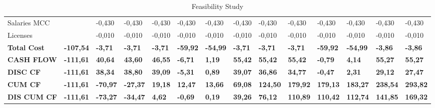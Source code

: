 \begin{landscape}
\begin{table}[]
{\begin{tabular}{| l | l | l | l | l | l | l | l | l | l | l | l | l | l |}
Salaries MCC                                                                           &                  & -0,430          & -0,430          & -0,430          & -0,430          & -0,430          & -0,430          & -0,430          & -0,430          & -0,430          & -0,430           & -0,430           & -0,430           \\
Licenses                                                                               &                  & -0,010          & -0,010          & -0,010          & -0,010          & -0,010          & -0,010          & -0,010          & -0,010          & -0,010          & -0,010           & -0,010           & -0,010           \\
\textbf{Total Cost}                                                                    & \textbf{-107,54} & \textbf{-3,71}  & \textbf{-3,71}  & \textbf{-3,71}  & \textbf{-59,92} & \textbf{-54,99} & \textbf{-3,71}  & \textbf{-3,71}  & \textbf{-3,71}  & \textbf{-59,92} & \textbf{-54,99}  & \textbf{-3,86}   & \textbf{-3,86}   
\\ \hline \hline
\rowcolor[gray]{0.85}
\textbf{CASH FLOW}                                                                     & \textbf{-111,61} & \textbf{40,64}  & \textbf{43,60}  & \textbf{46,55}  & \textbf{-6,71}  & \textbf{1,19}   & \textbf{55,42}  & \textbf{55,42}  & \textbf{55,42}  & \textbf{-0,79}  & \textbf{4,14}    & \textbf{55,27}   & \textbf{55,27}   \\
\rowcolor[gray]{0.85}
\textbf{DISC CF}                                                                       & \textbf{-111,61} & \textbf{38,34}  & \textbf{38,80}  & \textbf{39,09}  & \textbf{-5,31}  & \textbf{0,89}   & \textbf{39,07}  & \textbf{36,86}  & \textbf{34,77}  & \textbf{-0,47}  & \textbf{2,31}    & \textbf{29,12}   & \textbf{27,47}   \\
\rowcolor[gray]{0.85}
\textbf{CUM CF}                                                                        & \textbf{-111,61} & \textbf{-70,97} & \textbf{-27,37} & \textbf{19,18}  & \textbf{12,47}  & \textbf{13,66}  & \textbf{69,08}  & \textbf{124,50} & \textbf{179,92} & \textbf{179,13} & \textbf{183,27}  & \textbf{238,54}  & \textbf{293,82}  \\
\rowcolor[gray]{0.85}
\textbf{DIS CUM CF}                                                                    & \textbf{-111,61} & \textbf{-73,27} & \textbf{-34,47} & \textbf{4,62}   & \textbf{-0,69}  & \textbf{0,19}   & \textbf{39,26}  & \textbf{76,12}  & \textbf{110,89} & \textbf{110,42} & \textbf{112,74}  & \textbf{141,85}  & \textbf{169,32} 
\\ \hline
\end{tabular}
}
\vspace*{\fill}
\caption{Feasibility Study}
\label{Feasibility Study}
\end{table}
\end{landscape}

\restoregeometry